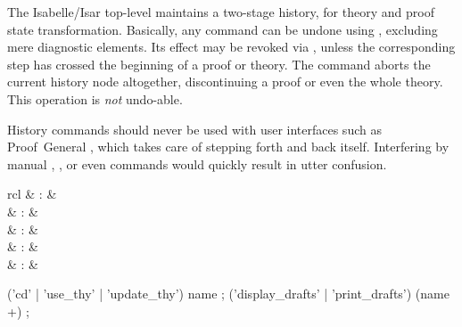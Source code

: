 \begin{isabellebody}
\begin{isamarkuptext}
  The Isabelle/Isar top-level maintains a two-stage history, for
  theory and proof state transformation.  Basically, any command can
  be undone using \mbox{}, excluding mere diagnostic
  elements.  Its effect may be revoked via \mbox{}, unless
  the corresponding \mbox{} step has crossed the beginning
  of a proof or theory.  The \mbox{} command aborts the
  current history node altogether, discontinuing a proof or even the
  whole theory.  This operation is \emph{not} undo-able.

  \begin{warn}
    History commands should never be used with user interfaces such as
    Proof~General \cite{proofgeneral,Aspinall:TACAS:2000}, which takes
    care of stepping forth and back itself.  Interfering by manual
    \mbox{}, \mbox{}, or even \mbox{}
    commands would quickly result in utter confusion.
  \end{warn}%
\end{isamarkuptext}%
\isamarkuptrue%
%
\isamarkuptrue%
%
\begin{isamarkuptext}%
\begin{matharray}{rcl}
    \mbox{}\isa{{\isachardoublequote}\isactrlsup {\isacharasterisk}{\isachardoublequote}} & : & \isarkeep{\cdot} \\
    \mbox{}\isa{{\isachardoublequote}\isactrlsup {\isacharasterisk}{\isachardoublequote}} & : & \isarkeep{\cdot} \\
    \mbox{}\isa{{\isachardoublequote}\isactrlsup {\isacharasterisk}{\isachardoublequote}} & : & \isarkeep{\cdot} \\
    \mbox{}\isa{{\isachardoublequote}\isactrlsup {\isacharasterisk}{\isachardoublequote}} & : & \isarkeep{\cdot} \\
    \mbox{}\isa{{\isachardoublequote}\isactrlsup {\isacharasterisk}{\isachardoublequote}} & : & \isarkeep{\cdot} \\
  \end{matharray}

  \begin{rail}
    ('cd' | 'use\_thy' | 'update\_thy') name
    ;
    ('display\_drafts' | 'print\_drafts') (name +)
    ;
  \end{rail}


\end{isamarkuptext}
\end{isabellebody}
